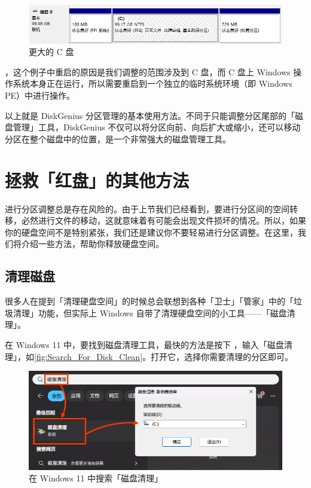 {\begin{figure}[htb!]
  \centering
  \includegraphics[width=.9\textwidth]{assets/advanced/Larger_C.png}
  \caption{更大的 C 盘}
  \label{fig:Larger_C}
\end{figure}

\begin{note}
  ，这个例子中重启的原因是我们调整的范围涉及到 C 盘，而 C 盘上 Windows 操作系统本身正在运行，所以需要重启到一个独立的临时系统环境（即 Windows PE）中进行操作。
\end{note}

以上就是 DiskGenius 分区管理的基本使用方法。不同于只能调整分区尾部的「磁盘管理」工具，DiskGenius 不仅可以将分区向前、向后扩大或缩小，还可以移动分区在整个磁盘中的位置，是一个非常强大的磁盘管理工具。

\section{拯救「红盘」的其他方法}

进行分区调整总是存在风险的。由于上节我们已经看到，要进行分区间的空间转移，必然进行文件的移动，这就意味着有可能会出现文件损坏的情况。所以，如果你的硬盘空间不是特别紧张，我们还是建议你不要轻易进行分区调整。在这里，我们将介绍一些方法，帮助你释放硬盘空间。

\subsection{清理磁盘}

很多人在提到「清理硬盘空间」的时候总会联想到各种「卫士」「管家」中的「垃圾清理」功能，但实际上 Windows 自带了清理硬盘空间的小工具——「磁盘清理」。

在 Windows 11 中，要找到磁盘清理工具，最快的方法是按下 ，输入「磁盘清理」，如\autoref{fig:Search_For_Disk_Clean}。打开它，选择你需要清理的分区即可。

\begin{figure}[htb!]
  \centering
  \includegraphics[width=.72\textwidth]{assets/advanced/Search_For_Disk_Clean.jpg}
  \caption{在 Windows 11 中搜索「磁盘清理」}
  \label{fig:Search_For_Disk_Clean}
\end{figure}

}
